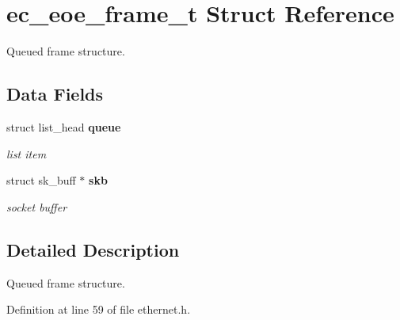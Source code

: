 \section{ec\-\_\-eoe\-\_\-frame\-\_\-t \-Struct \-Reference}
\label{structec__eoe__frame__t}


\-Queued frame structure.  


\subsection*{\-Data \-Fields}
\begin{DoxyCompactItemize}
\item 
struct list\-\_\-head {\bf queue}\label{structec__eoe__frame__t_a1c6d064788e29158bd03601b481bcfa5}

\begin{DoxyCompactList}\small\item\em list item \end{DoxyCompactList}\item 
struct sk\-\_\-buff $\ast$ {\bf skb}\label{structec__eoe__frame__t_a373ee9510d98da5da3077944d5d074cb}

\begin{DoxyCompactList}\small\item\em socket buffer \end{DoxyCompactList}\end{DoxyCompactItemize}


\subsection{\-Detailed \-Description}
\-Queued frame structure. 

\-Definition at line 59 of file ethernet.\-h.

